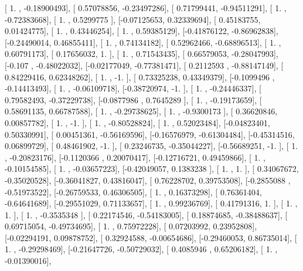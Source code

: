 \documentclass{article}
\begin{document}
       [ 1.        , -0.18900493],
       [ 0.57078856, -0.23497286],
       [ 0.71799441, -0.94511291],
       [ 1.        , -0.72383668],
       [ 1.        ,  0.5299775 ],
       [-0.07125653,  0.32339694],
       [ 0.45183755,  0.01424775],
       [ 1.        ,  0.43446254],
       [ 1.        ,  0.59385129],
       [-0.41876122, -0.86962838],
       [-0.24490014,  0.46855411],
       [ 1.        ,  0.74134182],
       [ 0.52962466, -0.68896513],
       [ 1.        ,  0.60791173],
       [ 0.17656032,  1.        ],
       [ 1.        ,  0.71543435],
       [ 0.66579053, -0.28047993],
       [-0.107     , -0.48022032],
       [-0.02177049, -0.77381471],
       [ 0.2112593 , -0.88147149],
       [ 0.84229416,  0.62348262],
       [ 1.        , -1.        ],
       [ 0.73325238,  0.43349379],
       [-0.1099496 , -0.14413493],
       [ 1.        , -0.06109718],
       [-0.38720974, -1.        ],
       [ 1.        , -0.24446337],
       [ 0.79582493, -0.37229738],
       [-0.0877986 ,  0.7645289 ],
       [ 1.        , -0.19173659],
       [ 0.58691135,  0.66787588],
       [ 1.        , -0.29738625],
       [ 1.        , -0.9300173 ],
       [ 0.36620846,  0.00857782],
       [ 1.        , -1.        ],
       [ 1.        , -0.80528824],
       [ 1.        ,  0.52023484],
       [-0.04823401,  0.50330991],
       [ 0.00451361, -0.56169596],
       [-0.16576979, -0.61304484],
       [-0.45314516,  0.06899729],
       [ 0.48461902, -1.        ],
       [ 0.23246735, -0.35044227],
       [-0.56689251, -1.        ],
       [ 1.        , -0.20823176],
       [-0.1120366 ,  0.20070417],
       [-0.12716721,  0.49459866],
       [ 1.        , -0.10154585],
       [ 1.        , -0.03657223],
       [-0.42049057,  0.1383238 ],
       [ 1.        ,  1.        ],
       [ 0.34067672, -0.35020528],
       [-0.36041827,  0.43816047],
       [ 0.76228702,  0.39753508],
       [-0.2855088 , -0.51973522],
       [-0.26759533,  0.46306505],
       [ 1.        ,  0.16373298],
       [ 0.76361404, -0.64641689],
       [-0.29551029,  0.71133657],
       [ 1.        ,  0.99236769],
       [ 0.41791316,  1.        ],
       [ 1.        ,  1.        ],
       [ 1.        , -0.3535348 ],
       [ 0.22174546, -0.54183005],
       [ 0.18874685, -0.38488637],
       [ 0.69715054, -0.49734695],
       [ 1.        ,  0.75972228],
       [ 0.07203992,  0.23952808],
       [-0.02294191,  0.09878752],
       [ 0.32924588, -0.00654686],
       [-0.29460053,  0.86735014],
       [ 1.        , -0.29298469],
       [-0.21647726, -0.50729032],
       [ 0.4085946 ,  0.65206182],
       [ 1.        , -0.01390016],
\end{document}
